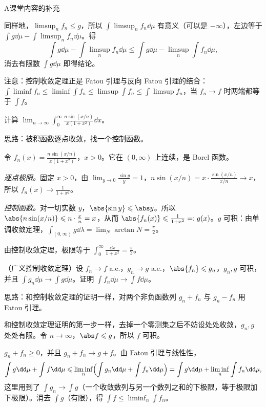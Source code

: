 \begin{exercises}{A}{课堂内容的补充}
\begin{solution}
同样地，$\limsup_nf_n\leqslant g$，所以 $\int\limsup_nf_n\dd\mu$ 有意义（可以是 $-\infty$），左边等于 $\int g\dd\mu-\int\limsup_nf_n\dd\mu$。得
\[
\int g\dd\mu-\int\limsup_nf_n\dd\mu\leqslant\int g\dd\mu-\limsup_n\int f_n\dd\mu ,
\]
消去有限数 $\int g\dd\mu$ 即得结论。

注意：控制收敛定理正是 Fatou 引理与反向 Fatou 引理的结合：$\int\liminf f_n\leqslant\liminf\int f_n\leqslant\limsup\int f_n\leqslant\int\limsup f_n$，当 $f_n\to f$ 时两端都等于 $\int f$。
\end{solution}

\item\label{ex:integration:A12} 计算 $\displaystyle\lim_{n\to\infty}\int_0^\infty\frac{n\sin(x/n)}{x(1+x^2)}\dd x$。
\begin{solution}
思路：被积函数逐点收敛，找一个控制函数。

令 $f_n(x)=\frac{n\sin(x/n)}{x(1+x^2)}$，$x>0$。它在 $(0,\infty)$ 上连续，是 Borel 函数。

\emph{逐点极限。}固定 $x>0$，由 $\lim_{y\to0}\frac{\sin y}y=1$，$n\sin(x/n)=x\cdot\frac{\sin(x/n)}{x/n}\to x$，所以 $f_n(x)\to\frac1{1+x^2}$。

\emph{控制函数。}对一切实数 $y$，$\abs{\sin y}\leqslant\abs y$。所以 $\abs{n\sin(x/n)}\leqslant n\cdot\frac xn=x$，从而 $\abs{f_n(x)}\leqslant\frac1{1+x^2}=:g(x)$。$g$ 可积：由单调收敛定理，$\int_{(0,\infty)}g\dd\lambda=\lim_N\arctan N=\frac\pi2$。

由控制收敛定理，极限等于 $\int_0^\infty\frac{\dd x}{1+x^2}=\frac\pi2$。
\end{solution}

\item\label{ex:integration:A13} （广义控制收敛定理）设 $f_n\to f$ a.e.，$g_n\to g$ a.e.，$\abs{f_n}\leqslant g_n$，$g_n,g$ 可积，并且 $\int g_n\dd\mu\to\int g\dd\mu$。证明 $\int f_n\dd\mu\to\int f\dd\mu$。
\begin{solution}
思路：和控制收敛定理的证明一样，对两个非负函数列 $g_n+f_n$ 与 $g_n-f_n$ 用 Fatou 引理。

和控制收敛定理证明的第一步一样，去掉一个零测集之后不妨设处处收敛，$g_n,g$ 处处有限。令 $n\to\infty$，$\abs f\leqslant g$，所以 $f$ 可积。

$g_n+f_n\geqslant0$，并且 $g_n+f_n\to g+f$。由 Fatou 引理与线性性，
\[
\int g\dd\mu+\int f\dd\mu\leqslant\liminf_n\Bigl(\int g_n\dd\mu+\int f_n\dd\mu\Bigr)=\int g\dd\mu+\liminf_n\int f_n\dd\mu ,
\]
这里用到了 $\int g_n\to\int g$（一个收敛数列与另一个数列之和的下极限，等于极限加下极限）。消去 $\int g$（有限），得 $\int f\leqslant\liminf_n\int f_n$。


\end{solution}
\end{exercises}
